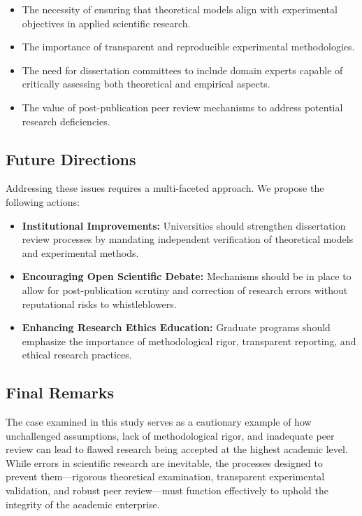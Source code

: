\documentclass[10pt,twocolumn]{article}
\begin{document}
\begin{itemize}
    \item The necessity of ensuring that theoretical models align with experimental objectives in applied scientific research.
    \item The importance of transparent and reproducible experimental methodologies.
    \item The need for dissertation committees to include domain experts capable of critically assessing both theoretical and empirical aspects.
    \item The value of post-publication peer review mechanisms to address potential research deficiencies.
\end{itemize}

\subsection{Future Directions}

Addressing these issues requires a multi-faceted approach. We propose the following actions:

\begin{itemize}
    \item \textbf{Institutional Improvements:} Universities should strengthen dissertation review processes by mandating independent verification of theoretical models and experimental methods.
    \item \textbf{Encouraging Open Scientific Debate:} Mechanisms should be in place to allow for post-publication scrutiny and correction of research errors without reputational risks to whistleblowers.
    \item \textbf{Enhancing Research Ethics Education:} Graduate programs should emphasize the importance of methodological rigor, transparent reporting, and ethical research practices.
\end{itemize}

\subsection{Final Remarks}

The case examined in this study serves as a cautionary example of how unchallenged assumptions, lack of methodological rigor, and inadequate peer review can lead to flawed research being accepted at the highest academic level. While errors in scientific research are inevitable, the processes designed to prevent them—rigorous theoretical examination, transparent experimental validation, and robust peer review—must function effectively to uphold the integrity of the academic enterprise.
\end{document}
